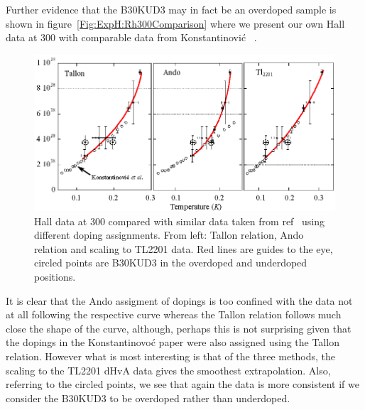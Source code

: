Further evidence that the B30KUD3 may in fact be an overdoped sample is shown in figure~\ref{Fig:ExpH:Rh300Comparison} where we present our own Hall data at \unit{300}{\kelvin} with comparable data from Konstantinovi\'c \etal~\cite{Konstantinovic2001}.
\begin{figure}[htbp]
    \begin{center}
        \includegraphics[scale=1.0]{Chapter-HallBSCO/Figures/Rh300Comparison/Rh300Comparison}
        \caption{Hall data at \unit{300}{\kelvin} compared with similar data taken from ref~\cite{Konstantinovic2001} using different doping assignments. From left: Tallon relation, Ando relation and scaling to \ac{TL2201} data. Red lines are guides to the eye, circled points are B30KUD3 in the overdoped and underdoped positions.}
        \label{Fig:Rh300Comparison}
    \end{center}
\end{figure}
It is clear that the Ando assigment of dopings is too confined with the data not at all following the respective curve whereas the Tallon relation follows much close the shape of the curve, although, perhaps this is not surprising given that the dopings in the Konstantinovo\'c paper were also assigned using the Tallon relation. However what is most interesting is that of the three methods, the scaling to the \ac{TL2201} \ac{dHvA} data gives the smoothest extrapolation. Also, referring to the circled points, we see that again the data is more consistent if we consider the B30KUD3 to be overdoped rather than underdoped.


